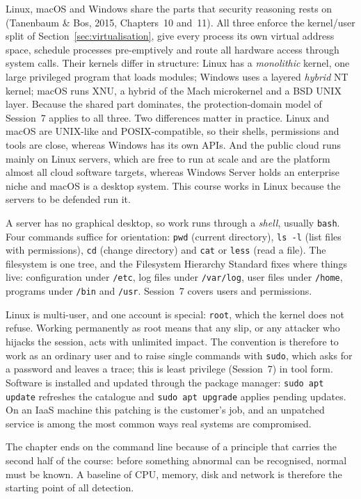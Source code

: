 Linux, macOS and Windows share the parts that security reasoning rests on
(Tanenbaum \& Bos, 2015, Chapters~10 and~11). All three enforce the
kernel/user split of Section~\ref{sec:virtualisation}, give every process
its own virtual address space, schedule processes pre-emptively and route
all hardware access through system calls. Their kernels differ in structure:
Linux has a \emph{monolithic} kernel, one large privileged program that
loads modules; Windows uses a layered \emph{hybrid} NT kernel; macOS runs
XNU, a hybrid of the Mach microkernel and a BSD UNIX layer. Because the
shared part dominates, the protection-domain model of Session~7 applies to
all three. Two differences matter in practice. Linux and macOS are UNIX-like
and POSIX-compatible, so their shells, permissions and tools are close,
whereas Windows has its own APIs. And the public cloud runs mainly on Linux
servers, which are free to run at scale and are the platform almost all
cloud software targets, whereas Windows Server holds an enterprise niche and
macOS is a desktop system. This course works in Linux because the servers to
be defended run it.

A server has no graphical desktop, so work runs through a \emph{shell},
usually \texttt{bash}. Four commands suffice for orientation: \texttt{pwd}
(current directory), \texttt{ls -l} (list files with permissions),
\texttt{cd} (change directory) and \texttt{cat} or \texttt{less} (read a
file). The filesystem is one tree, and the Filesystem Hierarchy Standard
fixes where things live: configuration under \texttt{/etc}, log files under
\texttt{/var/log}, user files under \texttt{/home}, programs under
\texttt{/bin} and \texttt{/usr}. Session~7 covers users and permissions.

Linux is multi-user, and one account is special: \texttt{root}, which the
kernel does not refuse. Working permanently as root means that any slip, or
any attacker who hijacks the session, acts with unlimited impact. The
convention is therefore to work as an ordinary user and to raise single
commands with \texttt{sudo}, which asks for a password and leaves a trace;
this is least privilege (Session~7) in tool form. Software is installed and
updated through the package manager: \texttt{sudo apt update} refreshes the
catalogue and \texttt{sudo apt upgrade} applies pending updates. On an IaaS
machine this patching is the customer's job, and an unpatched service is
among the most common ways real systems are compromised.

The chapter ends on the command line because of a principle that carries
the second half of the course: before something abnormal can be recognised,
normal must be known. A baseline of CPU, memory, disk and network is
therefore the starting point of all detection.

